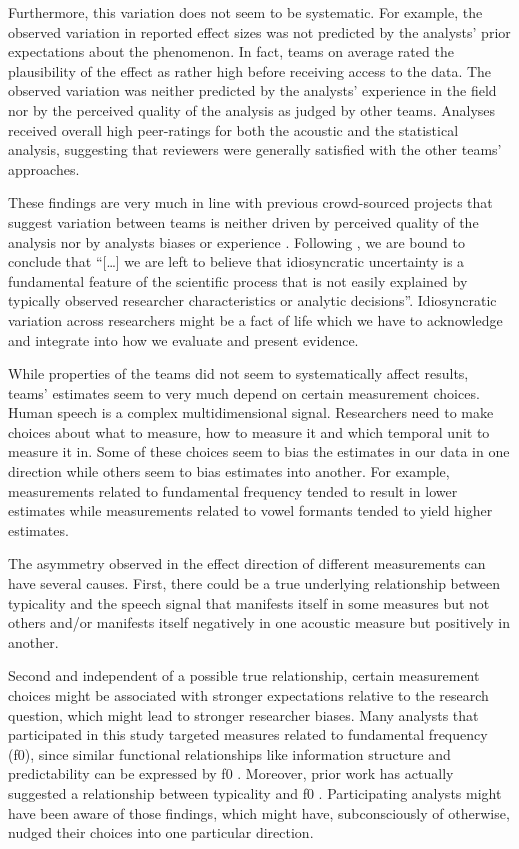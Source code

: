 \documentclass[Review,times,sageh]{sagej}
\begin{document}
Furthermore, this variation does not seem to be systematic.
For example, the observed variation in reported effect sizes was not predicted by the analysts' prior expectations about the phenomenon.
In fact, teams on average rated the plausibility of the effect as rather high before receiving access to the data.
The observed variation was neither predicted by the analysts' experience in the field nor by the perceived quality of the analysis as judged by other teams.
Analyses received overall high peer-ratings for both the acoustic and the statistical analysis, suggesting that reviewers were generally satisfied with the other teams' approaches.

These findings are very much in line with previous crowd-sourced projects that suggest variation between teams is neither driven by perceived quality of the analysis nor by analysts biases or experience \citep[e.g.,][\citet{breznau2021observing}]{silberzahn2018many}.
Following \citet[p.~9]{breznau2021observing}, we are bound to conclude that ``{[}\ldots{]} we are left to believe that idiosyncratic uncertainty is a fundamental feature of the scientific process that is not easily explained by typically observed researcher characteristics or analytic decisions''.
Idiosyncratic variation across researchers might be a fact of life which we have to acknowledge and integrate into how we evaluate and present evidence.

While properties of the teams did not seem to systematically affect results, teams' estimates seem to very much depend on certain measurement choices.
Human speech is a complex multidimensional signal.
Researchers need to make choices about what to measure, how to measure it and which temporal unit to measure it in.
Some of these choices seem to bias the estimates in our data in one direction while others seem to bias estimates into another.
For example, measurements related to fundamental frequency tended to result in lower estimates while measurements related to vowel formants tended to yield higher estimates.

The asymmetry observed in the effect direction of different measurements can have several causes.
First, there could be a true underlying relationship between typicality and the speech signal that manifests itself in some measures but not others and/or manifests itself negatively in one acoustic measure but positively in another.

Second and independent of a possible true relationship, certain measurement choices might be associated with stronger expectations relative to the research question, which might lead to stronger researcher biases.
Many analysts that participated in this study targeted measures related to fundamental frequency (f0), since similar functional relationships like information structure and predictability can be expressed by f0 \citep[e.g.][]{grice2017integrating, turnbull2017role}.
Moreover, prior work has actually suggested a relationship between typicality and f0 \citep[e.g.][]{dimitrova2008prosodic, dimitrova2009did}.
Participating analysts might have been aware of those findings, which might have, subconsciously of otherwise, nudged their choices into one particular direction.
\end{document}
